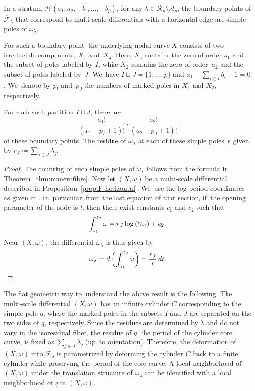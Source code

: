 \begin{prop}\label{prop:simple-pole}
In a stratum $\mathcal{H}(a_{1},a_{2},-b_{1},\dots,-b_{p})$, for any $\lambda \in \mathcal{R}_{p} \setminus \mathcal{A}_{p}$, the boundary points of $\overline{\mathcal{F}}_{\lambda}$ that correspond to multi-scale differentials with a horizontal edge are simple poles of $\omega_{\lambda}$.

For such a boundary point, the underlying nodal curve $X$ consists of two irreducible components, $X_1$ and~$X_2$. Here, $X_1$ contains the zero of order $a_1$ and the subset of poles labeled by $I$, while $X_2$ contains the zero of order~$a_2$ and the subset of poles labeled by~$J$. We~have $I\sqcup J = \{1,\ldots,p\}$ and $a_1 - \sum_{i \in I} b_i + 1 = 0$. We~denote by $p_{I}$ and~$p_{J}$ the numbers of marked poles in $X_{1}$ and $X_{2}$, respectively.

For each such partition $I \sqcup J$, there are
\begin{equation}
\frac{a_{1}!}{(a_{1}-p_{I}+1)!} \cdot \frac{a_{2}!}{(a_{2}-p_{J}+1)!}
\end{equation}
of these boundary points. The residue of $\omega_{\lambda}$ at each of these simple poles is given by $r_{J}\coloneqq\sum_{j \in J} \lambda_{j}$.
\end{prop}

\begin{proof}
The counting of such simple poles of $\omega_\lambda$ follows from the formula in Theorem~\ref{thm:numerofibre}. Now let $(X,\omega)$ be a multi-scale differential described in Proposition~\ref{prop:F-horizontal}. We~use the log period coordinates as given in \cite[\S\S10.10 \&~13.3]{BCGGM2}. In~particular, from the last equation of that section, if~the opening parameter of the node is $t$, then there exist constants $c_{1}$ and $c_{2}$ such that
\[
\int_{z_{1}}^{z_{2}}\omega = r_{J}\log\left(\sfrac{t}{c_{1}}\right) + c_{2} .
\]
Near $(X,\omega)$, the differential $\omega_{\lambda}$ is thus given by
\[
\omega_{\lambda} = d\left(\int_{z_{1}}^{z_{2}}\omega\right)=\frac{r_{J}}{t}\,dt.\qedhere
\]
\end{proof}

\begin{rmk}
The flat geometric way to understand the above result is the following. The multi-scale differential $(X,\omega)$ has an infinite cylinder $C$ corresponding to the simple pole $q$, where the marked poles in the subsets $I$ and $J$ are separated on the two sides of $q$, respectively. Since the residues are determined by $\lambda$ and do not vary in the isoresidual fiber, the residue of $q$, \ie the period of the cylinder core curve, is fixed as $\sum_{j \in J} \lambda_{j}$ (up~to orientation). Therefore, the deformation of $(X,\omega)$ into $\mathcal F_\lambda$ is parametrized by deforming the cylinder $C$ back to a finite cylinder while preserving the period of the core curve. A local neighborhood of $(X,\omega)$ under the translation structure of $\omega_\lambda$ can be identified with a local neighborhood of $q$ in $(X,\omega)$.
\end{rmk}

